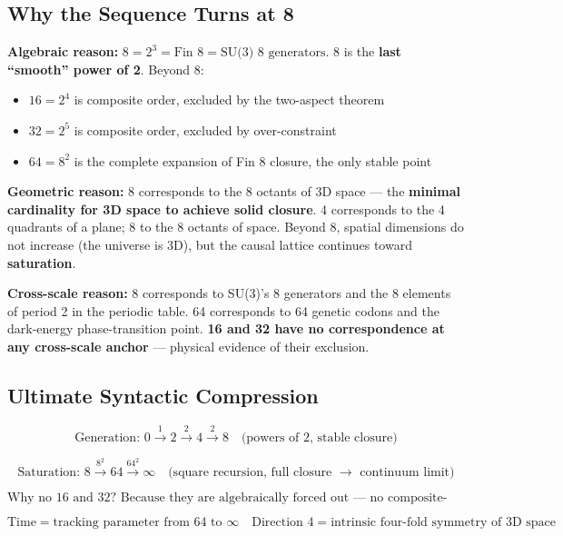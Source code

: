 \documentclass[aps,prd,twocolumn,nofootinbib,floatfix]{revtex4-2}
\begin{document}
\subsection{Why the Sequence Turns at 8}

\textbf{Algebraic reason:} $8 = 2^3 = \text{Fin 8} = \text{SU(3) 8 generators}$. 8 is the \textbf{last ``smooth'' power of 2}. Beyond 8:
\begin{itemize}
    \item $16 = 2^4$ is composite order, excluded by the two-aspect theorem
    \item $32 = 2^5$ is composite order, excluded by over-constraint
    \item $64 = 8^2$ is the complete expansion of Fin 8 closure, the only stable point
\end{itemize}

\textbf{Geometric reason:} 8 corresponds to the 8 octants of 3D space --- the \textbf{minimal cardinality for 3D space to achieve solid closure}. 4 corresponds to the 4 quadrants of a plane; 8 to the 8 octants of space. Beyond 8, spatial dimensions do not increase (the universe is 3D), but the causal lattice continues toward \textbf{saturation}.

\textbf{Cross-scale reason:} 8 corresponds to SU(3)'s 8 generators and the 8 elements of period 2 in the periodic table. 64 corresponds to 64 genetic codons and the dark-energy phase-transition point. \textbf{16 and 32 have no correspondence at any cross-scale anchor} --- physical evidence of their exclusion.

\subsection{Ultimate Syntactic Compression}

\[
\boxed{
\text{Generation: } 0 \xrightarrow{1} 2 \xrightarrow{2} 4 \xrightarrow{2} 8 \quad \text{(powers of 2, stable closure)}
}
\]

\[
\boxed{
\text{Saturation: } 8 \xrightarrow{8^2} 64 \xrightarrow{64^2} \infty \quad \text{(square recursion, full closure } \to \text{ continuum limit)}
}
\]

\[
\boxed{
\text{Why no 16 and 32? Because they are algebraically forced out --- no composite-order lattice can carry a unitary and injective causal-information structure.}
}
\]

\[
\boxed{
\text{Time} = \text{tracking parameter from 64 to } \infty \quad \text{Direction 4} = \text{intrinsic four-fold symmetry of 3D space}
}
\]
\end{document}
